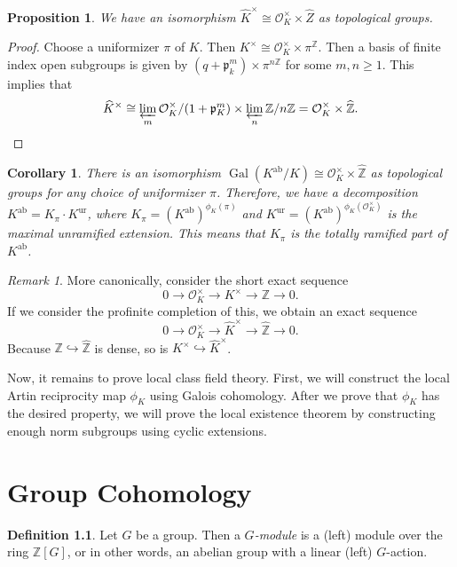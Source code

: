 \documentclass[leqno, openany]{memoir}
\newtheorem{cor}[thm]{Corollary}
\newtheorem{prop}[thm]{Proposition}
\theoremstyle{definition}
\newtheorem{defn}[thm]{Definition}
\theoremstyle{remark}
\newtheorem{rmk}[thm]{Remark}
\theoremstyle{plain}
\theoremstyle{definition}
\theoremstyle{remark}
\newcommand{\Z}{\mathbb{Z}}
\newcommand{\mc}[1]{\mathcal{#1}}
\newcommand{\mf}[1]{\mathfrak{#1}}
\newcommand{\mr}[1]{\mathrm{#1}}
\newcommand{\wh}[1]{\widehat{#1}}
\DeclareMathOperator{\Gal}{Gal}
\begin{document}
\begin{prop}
    We have an isomorphism $\wh{K}^{\times} \cong \mc{O}_K^{\times} \times \wh{Z}$ as topological groups.
\end{prop}

\begin{proof}
    Choose a uniformizer $\pi$ of $K$. Then $K^{\times} \cong \mc{O}_K^{\times} \times \pi^{\Z}$. Then a basis of finite index open subgroups is given by $(q+\mf{p}_k^m) \times \pi^{n\Z}$ for some $m,n \geq 1$. This implies that
    \[ \wh{K}^{\times} \cong \varprojlim_m \mc{O}_K^{\times} / (1+\mf{p}_K^m) \times \varprojlim_n \Z/n\Z = \mc{O}_K^{\times} \times \wh{\Z}. \qedhere \]
\end{proof}

\begin{cor}
    There is an isomorphism $\Gal(K^{\mr{ab}}/K) \cong \mc{O}_K^{\times} \times \wh{\Z}$ as topological groups for any choice of uniformizer $\pi$. Therefore, we have a decomposition $K^{\mr{ab}} = K_{\pi} \cdot K^{\mr{ur}}$, where $K_{\pi} = {(K^{\mr{ab}})}^{\phi_K(\pi)}$ and $K^{\mr{ur}} = {(K^{\mr{ab}})}^{\phi_K(\mc{O}_K^{\times})}$ is the maximal unramified extension. This means that $K_{\pi}$ is the totally ramified part of $K^{\mr{ab}}$.
\end{cor}

\begin{rmk}
    More canonically, consider the short exact sequence
    \[ 0 \to \mc{O}_K^{\times} \to K^{\times} \to \Z \to 0. \]
    If we consider the profinite completion of this, we obtain an exact sequence
    \[ 0 \to \mc{O}_K^{\times} \to \wh{K}^{\times} \to \wh{\Z} \to 0. \]
    Because $\Z \hookrightarrow \wh{\Z}$ is dense, so is $K^{\times} \hookrightarrow \wh{K}^{\times}$.
\end{rmk}


Now, it remains to prove local class field theory. First, we will construct the local Artin reciprocity map $\phi_K$ using Galois cohomology. After we prove that $\phi_K$ has the desired property, we will prove the local existence theorem by constructing enough norm subgroups using cyclic extensions.

\chapter{Group Cohomology}%
\label{sec:group_cohomology}

\begin{defn}
    Let $G$ be a group. Then a \textit{$G$-module} is a (left) module over the ring $\Z[G]$, or in other words, an abelian group with a linear (left) $G$-action.
\end{defn}
\end{document}
